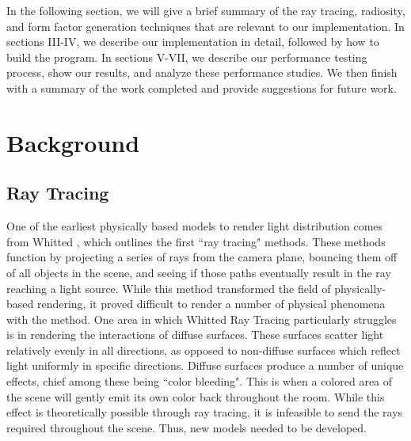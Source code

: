 \documentclass[conference]{IEEEtran}
\begin{document}
In the following section, we will give a brief summary of the ray tracing, radiosity, and form factor generation techniques that are relevant to our implementation. In sections III-IV, we describe our implementation in detail, followed by how to build the program. In sections V-VII, we describe our performance testing process, show our results, and analyze these performance studies. We then finish with a summary of the work completed and provide suggestions for future work.


\section{Background}
\subsection{Ray Tracing}
One of the earliest physically based models to render light distribution comes from Whitted \cite{b10}, which outlines the first ``ray tracing" methods. These methods function by projecting a series of rays from the camera plane, bouncing them off of all objects in the scene, and seeing if those paths eventually result in the ray reaching a light source. While this method transformed the field of physically-based rendering, it proved difficult to render a number of physical phenomena with the method. One area in which Whitted Ray Tracing particularly struggles is in rendering the interactions of diffuse surfaces. These surfaces scatter light relatively evenly in all directions, as opposed to non-diffuse surfaces which reflect light uniformly in specific directions. Diffuse surfaces produce a number of unique effects, chief among these being ``color bleeding". This is when a colored area of the scene will gently emit its own color back throughout the room. While this effect is theoretically possible through ray tracing, it is infeasible to send the rays required throughout the scene. Thus, new models needed to be developed.
\end{document}
